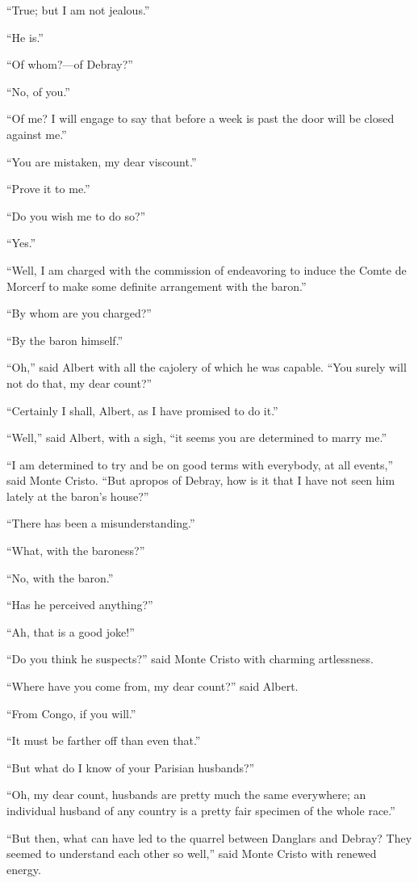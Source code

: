 “True; but I am not jealous.”

“He is.”

“Of whom?—of Debray?”

“No, of you.”

“Of me? I will engage to say that before a week is past the door will
be closed against me.”

“You are mistaken, my dear viscount.”

“Prove it to me.”

“Do you wish me to do so?”

“Yes.”

“Well, I am charged with the commission of endeavoring to induce the
Comte de Morcerf to make some definite arrangement with the baron.”

“By whom are you charged?”

“By the baron himself.”

“Oh,” said Albert with all the cajolery of which he was capable. “You
surely will not do that, my dear count?”

“Certainly I shall, Albert, as I have promised to do it.”

“Well,” said Albert, with a sigh, “it seems you are determined to marry
me.”

“I am determined to try and be on good terms with everybody, at all
events,” said Monte Cristo. “But apropos of Debray, how is it that I
have not seen him lately at the baron’s house?”

“There has been a misunderstanding.”

“What, with the baroness?”

“No, with the baron.”

“Has he perceived anything?”

“Ah, that is a good joke!”

“Do you think he suspects?” said Monte Cristo with charming
artlessness.

“Where have you come from, my dear count?” said Albert.

“From Congo, if you will.”

“It must be farther off than even that.”

“But what do I know of your Parisian husbands?”

“Oh, my dear count, husbands are pretty much the same everywhere; an
individual husband of any country is a pretty fair specimen of the
whole race.”

“But then, what can have led to the quarrel between Danglars and
Debray? They seemed to understand each other so well,” said Monte
Cristo with renewed energy.


